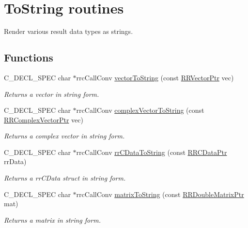 \hypertarget{group__to_string}{}\section{To\+String routines}
\label{group__to_string}


Render various result data types as strings.  


\subsection*{Functions}
\begin{DoxyCompactItemize}
\item 
C\+\_\+\+D\+E\+C\+L\+\_\+\+S\+P\+E\+C char $\ast$rrc\+Call\+Conv \hyperlink{group__to_string_gaff70db9c262110e72d1cf090b04d05a3}{vector\+To\+String} (const \hyperlink{rrc__types_8h_a3be72d6006034fd349f753d2bf441bf7}{R\+R\+Vector\+Ptr} vec)
\begin{DoxyCompactList}\small\item\em Returns a vector in string form. \end{DoxyCompactList}\item 
C\+\_\+\+D\+E\+C\+L\+\_\+\+S\+P\+E\+C char $\ast$rrc\+Call\+Conv \hyperlink{group__to_string_gaef1d1f1789f4c5bca4e6b7af4bf53885}{complex\+Vector\+To\+String} (const \hyperlink{rrc__types_8h_ae05c63419a6ca0575eb327fd04dae4b5}{R\+R\+Complex\+Vector\+Ptr} vec)
\begin{DoxyCompactList}\small\item\em Returns a complex vector in string form. \end{DoxyCompactList}\item 
C\+\_\+\+D\+E\+C\+L\+\_\+\+S\+P\+E\+C char $\ast$rrc\+Call\+Conv \hyperlink{group__to_string_ga9ecd62cd0fd10a179bd2fe5e55f69929}{rr\+C\+Data\+To\+String} (const \hyperlink{rrc__types_8h_a9da8b124eb9c3c0045f8926c6a420b4a}{R\+R\+C\+Data\+Ptr} rr\+Data)
\begin{DoxyCompactList}\small\item\em Returns a rr\+C\+Data struct in string form. \end{DoxyCompactList}\item 
C\+\_\+\+D\+E\+C\+L\+\_\+\+S\+P\+E\+C char $\ast$rrc\+Call\+Conv \hyperlink{group__to_string_ga02a9a7fee7703402fcf6e36f30d384be}{matrix\+To\+String} (const \hyperlink{rrc__types_8h_ae586a879d30f0823087e42d93464b5dd}{R\+R\+Double\+Matrix\+Ptr} mat)
\begin{DoxyCompactList}\small\item\em Returns a matrix in string form. \end{DoxyCompactList}\item 

\end{DoxyCompactItemize}
